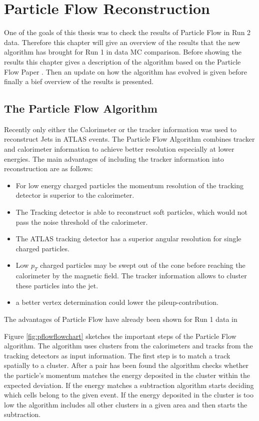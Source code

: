 \chapter{Particle Flow Reconstruction}

One of the goals of this thesis was to check the results of Particle Flow in Run 2 data. Therefore this chapter will give an overview of the results that the new algorithm has brought for Run 1 in data MC comparison. Before showing the results this chapter gives a description of the algorithm based on the Particle Flow Paper \cite{pflow16}. Then an update on how the algorithm has evolved is given before finally a bief overview of the results is presented.

\section{The Particle Flow Algorithm}

Recently only either the Calorimeter or the tracker information was used to reconstruct Jets in ATLAS events. The Particle Flow Algorithm combines tracker and calorimeter information to achieve better resolution especially at lower energies. The main advantages of including the tracker information into reconstruction are as follows:


\begin{itemize}
\item For low energy charged particles the momentum resolution of the tracking detector is superior to the calorimeter.
\item The Tracking detector is able to reconstruct soft particles, which would not pass the noise threshold of the calorimeter.
\item The ATLAS tracking detector has a superior angular resolution for single charged particles.
\item Low $p_T$ charged particles may be swept out of the cone before reaching the calorimeter by the magnetic field. The tracker information allows to cluster these particles into the jet.
\item a better vertex determination could lower the pileup-contribution.
\end{itemize}

The advantages of Particle Flow have already been shown for Run 1 data in

Figure \ref{fig:pflowflowchart} sketches the important steps of the Particle Flow algorithm. The algorithm uses clusters from the calorimeters and tracks from the tracking detectors as input information. The first step is to match a track spatially to a cluster. After a pair has been found the algorithm checks whether the particle's momentum matches the energy deposited in the cluster within the expected deviation. If the energy matches a subtraction algorithm starts deciding which cells belong to the given event. If the energy deposited in the cluster is too low the algorithm includes all other clusters in a given area and then starts the subtraction.

